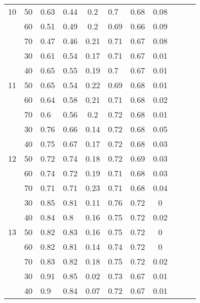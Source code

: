 \begin{table}[htbp]
\begin{tabular}{|c|c|p{3.855em}p{3.07em}c|p{3.855em}p{3.07em}c|ccc|}
    10    & 50    & 0.63  & 0.44  & 0.2   & 0.7   & 0.68  & 0.08  &       &       &  \\
          & 60    & 0.51  & 0.49  & 0.2   & 0.69  & 0.66  & 0.09  &       &       &  \\
          & 70    & 0.47  & 0.46  & 0.21  & 0.71  & 0.67  & 0.08  &       &       &  \\
    \midrule
          & 30    & 0.61  & 0.54  & 0.17  & 0.71  & 0.67  & 0.01  &       &       &  \\
          & 40    & 0.65  & 0.55  & 0.19  & 0.7   & 0.67  & 0.01  &       &       &  \\
    11    & 50    & 0.65  & 0.54  & 0.22  & 0.69  & 0.68  & 0.01  &       &       &  \\
          & 60    & 0.64  & 0.58  & 0.21  & 0.71  & 0.68  & 0.02  &       &       &  \\
          & 70    & 0.6   & 0.56  & 0.2   & 0.72  & 0.68  & 0.01  &       &       &  \\
    \midrule
          & 30    & 0.76  & 0.66  & 0.14  & 0.72  & 0.68  & 0.05  &       &       &  \\
          & 40    & 0.75  & 0.67  & 0.17  & 0.72  & 0.68  & 0.03  &       &       &  \\
    12    & 50    & 0.72  & 0.74  & 0.18  & 0.72  & 0.69  & 0.03  &       &       &  \\
          & 60    & 0.74  & 0.72  & 0.19  & 0.71  & 0.68  & 0.03  &       &       &  \\
          & 70    & 0.71  & 0.71  & 0.23  & 0.71  & 0.68  & 0.04  &       &       &  \\
    \midrule
          & 30    & 0.85  & 0.81  & 0.11  & 0.76  & 0.72  & 0     &       &       &  \\
          & 40    & 0.84  & 0.8   & 0.16  & 0.75  & 0.72  & 0.02  &       &       &  \\
    13    & 50    & 0.82  & 0.83  & 0.16  & 0.75  & 0.72  & 0     &       &       &  \\
          & 60    & 0.82  & 0.81  & 0.14  & 0.74  & 0.72  & 0     &       &       &  \\
          & 70    & 0.83  & 0.82  & 0.18  & 0.75  & 0.72  & 0.02  &       &       &  \\
    \midrule
          & 30    & 0.91  & 0.85  & 0.02  & 0.73  & 0.67  & 0.01  &       &       &  \\
          & 40    & 0.9   & 0.84  & 0.07  & 0.72  & 0.67  & 0.01  &       &       &  \\

\end{tabular}
\end{table}
